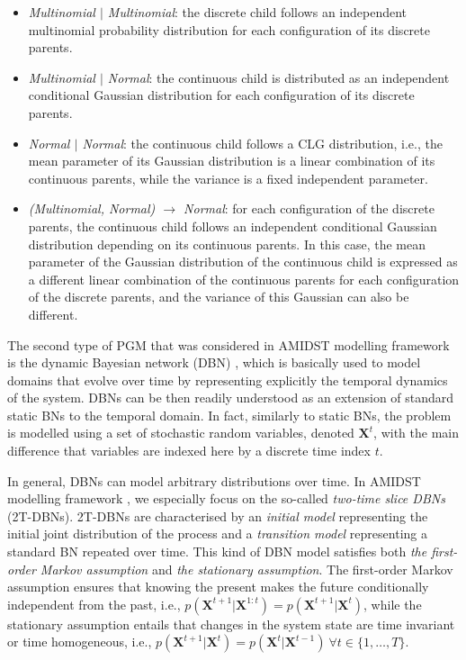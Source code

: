 \begin{itemize}
\item \emph{Multinomial $\mid$ Multinomial}: the discrete child follows an independent multinomial probability distribution for each configuration of its discrete parents.

\item \emph{Multinomial $\mid$ Normal}: the continuous child is distributed as an independent conditional Gaussian distribution for each configuration of its discrete parents. 

\item \emph{Normal $\mid$ Normal}: the continuous child follows a CLG distribution, i.e., the mean parameter of its Gaussian distribution is a linear combination of its continuous parents, while the variance is a fixed independent parameter. 

\item \emph{(Multinomial, Normal) $\rightarrow$ Normal}: for each configuration of the discrete parents, the continuous child follows an independent conditional Gaussian distribution depending on its continuous parents. In this case, the mean parameter of the Gaussian distribution of the continuous child is expressed as a different linear combination of the continuous parents for each configuration of the discrete parents, and the variance of this Gaussian can also be different. 

\end{itemize}
 

The second type of PGM that was considered in AMIDST modelling framework is the dynamic Bayesian network (DBN) \cite{DeanKanazawa1989}, which is basically used to model domains that evolve over time by representing explicitly the temporal dynamics of the system. DBNs can be then readily understood as an extension of standard static BNs to the temporal domain. In fact, similarly to static BNs, the problem is modelled using a set of stochastic random variables, denoted $\bm{X}^t$, with the main difference that variables are indexed here by a discrete time index $t$.

In general, DBNs can model arbitrary distributions over time. In AMIDST modelling framework \cite{Deliverable2.1},  we especially focus on the so-called \textit{two-time slice DBNs} (2T-DBNs). 2T-DBNs are characterised by an \textit{initial model} representing the initial joint distribution of the process and a \textit{transition model} representing a standard BN repeated over time. This kind of DBN model satisfies both \textit{the first-order Markov assumption} and \textit{the stationary assumption}. The first-order Markov assumption ensures that knowing the present makes the future conditionally independent from the past, i.e., $p(\bm X^{t+1} | \bm X^{1:t})  = p(\bm X^{t+1} | \bm X^{t})$, while the stationary assumption entails that changes in the system state are time invariant or time homogeneous, i.e., $p(\bm X^{t+1}|\bm X^{t}) = p(\bm X^t|\bm X^{t-1})\ \forall t \in\{1,\ldots,T\}$. 

